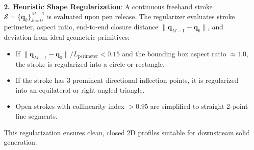 \textbf{2. Heuristic Shape Regularization}: A continuous freehand stroke $\mathcal{S} = \{\mathbf{q}_k\}_{k=0}^{M-1}$ is evaluated upon pen release. The regularizer evaluates stroke perimeter, aspect ratio, end-to-end closure distance $\|\mathbf{q}_{M-1} - \mathbf{q}_0\|$, and deviation from ideal geometric primitives:
\begin{itemize}
    \item If $\|\mathbf{q}_{M-1} - \mathbf{q}_0\| / L_{\text{perimeter}} < 0.15$ and the bounding box aspect ratio $\approx 1.0$, the stroke is regularized into a circle or rectangle.
    \item If the stroke has 3 prominent directional inflection points, it is regularized into an equilateral or right-angled triangle.
    \item Open strokes with collinearity index $> 0.95$ are simplified to straight 2-point line segments.
\end{itemize}
This regularization ensures clean, closed 2D profiles suitable for downstream solid generation.
